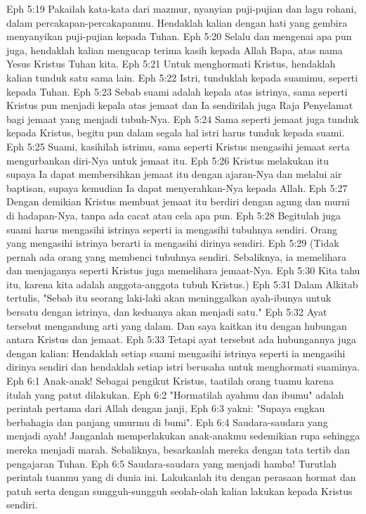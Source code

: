 Eph 5:19  Pakailah kata-kata dari mazmur, nyanyian puji-pujian dan lagu rohani, dalam percakapan-percakapanmu. Hendaklah kalian dengan hati yang gembira menyanyikan puji-pujian kepada Tuhan.
Eph 5:20  Selalu dan mengenai apa pun juga, hendaklah kalian mengucap terima kasih kepada Allah Bapa, atas nama Yesus Kristus Tuhan kita.
Eph 5:21  Untuk menghormati Kristus, hendaklah kalian tunduk satu sama lain.
Eph 5:22  Istri, tunduklah kepada suamimu, seperti kepada Tuhan.
Eph 5:23  Sebab suami adalah kepala atas istrinya, sama seperti Kristus pun menjadi kepala atas jemaat dan Ia sendirilah juga Raja Penyelamat bagi jemaat yang menjadi tubuh-Nya.
Eph 5:24  Sama seperti jemaat juga tunduk kepada Kristus, begitu pun dalam segala hal istri harus tunduk kepada suami.
Eph 5:25  Suami, kasihilah istrimu, sama seperti Kristus mengasihi jemaat serta mengurbankan diri-Nya untuk jemaat itu.
Eph 5:26  Kristus melakukan itu supaya Ia dapat membersihkan jemaat itu dengan ajaran-Nya dan melalui air baptisan, supaya kemudian Ia dapat menyerahkan-Nya kepada Allah.
Eph 5:27  Dengan demikian Kristus membuat jemaat itu berdiri dengan agung dan murni di hadapan-Nya, tanpa ada cacat atau cela apa pun.
Eph 5:28  Begitulah juga suami harus mengasihi istrinya seperti ia mengasihi tubuhnya sendiri. Orang yang mengasihi istrinya berarti ia mengasihi dirinya sendiri.
Eph 5:29  (Tidak pernah ada orang yang membenci tubuhnya sendiri. Sebaliknya, ia memelihara dan menjaganya seperti Kristus juga memelihara jemaat-Nya.
Eph 5:30  Kita tahu itu, karena kita adalah anggota-anggota tubuh Kristus.)
Eph 5:31  Dalam Alkitab tertulis, "Sebab itu seorang laki-laki akan meninggalkan ayah-ibunya untuk bersatu dengan istrinya, dan keduanya akan menjadi satu."
Eph 5:32  Ayat tersebut mengandung arti yang dalam. Dan saya kaitkan itu dengan hubungan antara Kristus dan jemaat.
Eph 5:33  Tetapi ayat tersebut ada hubungannya juga dengan kalian: Hendaklah setiap suami mengasihi istrinya seperti ia mengasihi dirinya sendiri dan hendaklah setiap istri berusaha untuk menghormati suaminya.
Eph 6:1  Anak-anak! Sebagai pengikut Kristus, taatilah orang tuamu karena itulah yang patut dilakukan.
Eph 6:2  "Hormatilah ayahmu dan ibumu" adalah perintah pertama dari Allah dengan janji,
Eph 6:3  yakni: "Supaya engkau berbahagia dan panjang umurmu di bumi".
Eph 6:4  Saudara-saudara yang menjadi ayah! Janganlah memperlakukan anak-anakmu sedemikian rupa sehingga mereka menjadi marah. Sebaliknya, besarkanlah mereka dengan tata tertib dan pengajaran Tuhan.
Eph 6:5  Saudara-saudara yang menjadi hamba! Turutlah perintah tuanmu yang di dunia ini. Lakukanlah itu dengan perasaan hormat dan patuh serta dengan sungguh-sungguh seolah-olah kalian lakukan kepada Kristus sendiri.
